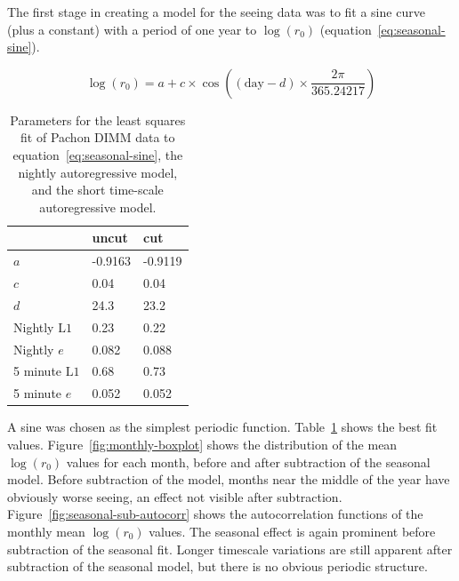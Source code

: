 \documentclass[\docopts]{\docclass}
\begin{document}
The first stage in creating a model for the seeing data was to fit a
sine curve (plus a constant) with a period of one year to
$\log(r_0)$ (equation~\ref{eq:seasonal-sine}).

\begin{equation} \label{eq:seasonal-sine}
\log(r_0) = a + c \times \cos\left( (\mbox{day} - d) \times \frac{2\pi}{365.24217} \right)
\end{equation}

\begin{table}
\begin{center}
  \begin{tabular}{ l l l } \hline
      & uncut & cut \\ \hline
  $a$ & -0.9163 & -0.9119\\
  $c$ & 0.04 & 0.04 \\
  $d$ & 24.3 &  23.2 \\ \hline
  Nightly $\mbox{L1}$ & 0.23 & 0.22 \\
  Nightly $e$ & 0.082 & 0.088\\ \hline
  5 minute $\mbox{L1}$ & 0.68 & 0.73\\
  5 minute $e$ & 0.052 & 0.052\\ \hline
\end{tabular}
\caption{Parameters for the least squares fit of Pachon DIMM data to
  equation~\ref{eq:seasonal-sine}, the nightly autoregressive model,
  and the short time-scale autoregressive model.}\label{tab:fit-params}
\end{center}
\end{table}

A sine was chosen as the simplest periodic
function. Table~\ref{tab:fit-params} shows the best fit
values. Figure~\ref{fig:monthly-boxplot} shows the distribution of the
mean $\log(r_0)$ values for each month, before and after subtraction
of the seasonal model. Before subtraction of the model, months near
the middle of the year have obviously worse seeing, an effect not
visible after subtraction. Figure~\ref{fig:seasonal-sub-autocorr}
shows the autocorrelation functions of the monthly mean $\log(r_0)$
values. The seasonal effect is again prominent before subtraction of
the seasonal fit. Longer timescale variations are still apparent after
subtraction of the seasonal model, but there is no obvious periodic
structure.
\end{document}
